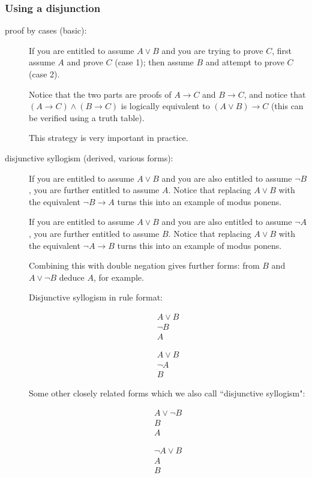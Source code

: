 \documentclass[12pt]{article}
\begin{document}
\subsubsection{Using a disjunction}

\begin{description}

\item[proof by cases (basic):]  If you are entitled to assume $A \vee B$ and you are trying to prove $C$, first assume $A$ and prove $C$ (case 1);
then assume $B$ and attempt to prove $C$ (case 2).  

Notice that the two parts are proofs of $A \rightarrow C$ and $B \rightarrow C$,
and notice that $(A \rightarrow C) \wedge (B \rightarrow C)$ is logically equivalent to $(A \vee B) \rightarrow C$ (this can be verified using a truth table).

This strategy is very important in practice.


\item[disjunctive syllogism (derived, various forms):]  If you are entitled to assume $A \vee B$ and you are also entitled to assume $\neg B$, you are further entitled to assume $A$.  Notice that replacing $A \vee B$ with the equivalent $\neg B \rightarrow A$ turns this into an example of modus ponens.


If you are entitled to assume $A \vee B$ and you are also entitled to assume $\neg A$, you are further entitled to assume $B$.  Notice that replacing $A \vee B$ with the equivalent $\neg A \rightarrow B$ turns this into an example of modus ponens.

Combining this with double negation gives further forms:  from $B$ and $A \vee \neg B$ deduce $A$, for example.

Disjunctive syllogism in rule format:

$$\begin{array}{r}  A \vee B \\ \neg B \\ \hline A \end{array}$$

$$\begin{array}{r}  A \vee B \\ \neg A \\ \hline B \end{array}$$

Some other closely related forms which we also call ``disjunctive syllogism":

$$\begin{array}{r}  A \vee \neg B \\ B \\ \hline A \end{array}$$

$$\begin{array}{r}  \neg A \vee B \\ A \\ \hline B \end{array}$$

\end{description}
\end{document}
